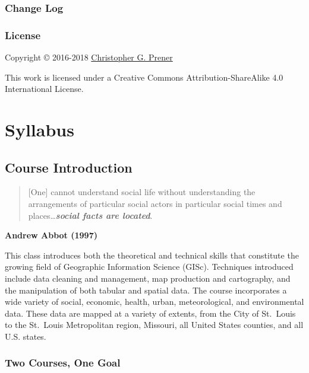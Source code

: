 \documentclass[]{book}
\begin{document}
\hypertarget{change-log}{%
\section*{Change Log}\label{change-log}}

\hypertarget{license}{%
\section*{License}\label{license}}

Copyright © 2016-2018 \href{https://chris-prener.github.io}{Christopher G. Prener}

This work is licensed under a Creative Commons Attribution-ShareAlike 4.0 International License.

\hypertarget{part-syllabus}{%
\part{Syllabus}\label{part-syllabus}}

\hypertarget{course-introduction}{%
\chapter{Course Introduction}\label{course-introduction}}

\begin{quote}
{[}One{]} cannot understand social life without understanding the arrangements of particular social actors in particular social times and places\ldots{}\textbf{\emph{social facts are located}}.
\end{quote}

\textbf{Andrew Abbot (1997)}

This class introduces both the theoretical and technical skills that constitute the growing field of Geographic Information Science (GISc). Techniques introduced include data cleaning and management, map production and cartography, and the manipulation of both tabular and spatial data. The course incorporates a wide variety of social, economic, health, urban, meteorological, and environmental data. These data are mapped at a variety of extents, from the City of St.~Louis to the St.~Louis Metropolitan region, Missouri, all United States counties, and all U.S. states.

\hypertarget{two-courses-one-goal}{%
\section{Two Courses, One Goal}\label{two-courses-one-goal}}
\end{document}
